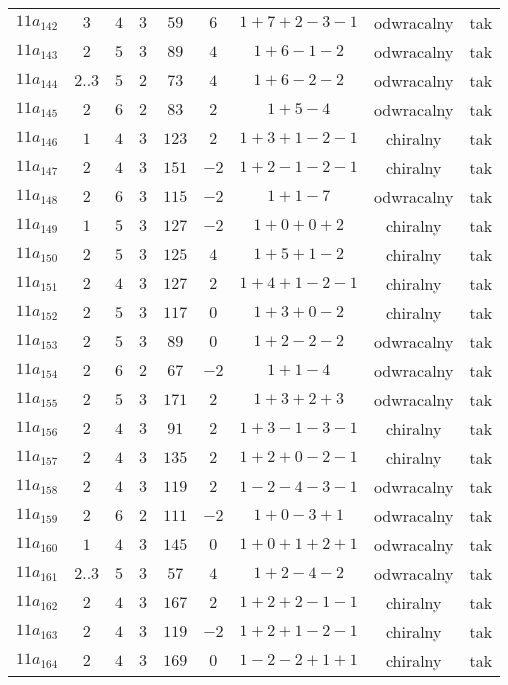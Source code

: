 \begin{longtable}{ccccccccc}
$11a_{142}$ & $3$ & $4$ & $3$ & $59$ & $6$ & $1+7+2-3-1$ & odwracalny & tak \\
$11a_{143}$ & $2$ & $5$ & $3$ & $89$ & $4$ & $1+6-1-2$ & odwracalny & tak \\
$11a_{144}$ & $2..3$ & $5$ & $2$ & $73$ & $4$ & $1+6-2-2$ & odwracalny & tak \\
$11a_{145}$ & $2$ & $6$ & $2$ & $83$ & $2$ & $1+5-4$ & odwracalny & tak \\
$11a_{146}$ & $1$ & $4$ & $3$ & $123$ & $2$ & $1+3+1-2-1$ & chiralny & tak \\
$11a_{147}$ & $2$ & $4$ & $3$ & $151$ & $-2$ & $1+2-1-2-1$ & chiralny & tak \\
$11a_{148}$ & $2$ & $6$ & $3$ & $115$ & $-2$ & $1+1-7$ & odwracalny & tak \\
$11a_{149}$ & $1$ & $5$ & $3$ & $127$ & $-2$ & $1+0+0+2$ & chiralny & tak \\
$11a_{150}$ & $2$ & $5$ & $3$ & $125$ & $4$ & $1+5+1-2$ & chiralny & tak \\
$11a_{151}$ & $2$ & $4$ & $3$ & $127$ & $2$ & $1+4+1-2-1$ & chiralny & tak \\
$11a_{152}$ & $2$ & $5$ & $3$ & $117$ & $0$ & $1+3+0-2$ & chiralny & tak \\
$11a_{153}$ & $2$ & $5$ & $3$ & $89$ & $0$ & $1+2-2-2$ & odwracalny & tak \\
$11a_{154}$ & $2$ & $6$ & $2$ & $67$ & $-2$ & $1+1-4$ & odwracalny & tak \\
$11a_{155}$ & $2$ & $5$ & $3$ & $171$ & $2$ & $1+3+2+3$ & odwracalny & tak \\
$11a_{156}$ & $2$ & $4$ & $3$ & $91$ & $2$ & $1+3-1-3-1$ & chiralny & tak \\
$11a_{157}$ & $2$ & $4$ & $3$ & $135$ & $2$ & $1+2+0-2-1$ & chiralny & tak \\
$11a_{158}$ & $2$ & $4$ & $3$ & $119$ & $2$ & $1-2-4-3-1$ & odwracalny & tak \\
$11a_{159}$ & $2$ & $6$ & $2$ & $111$ & $-2$ & $1+0-3+1$ & odwracalny & tak \\
$11a_{160}$ & $1$ & $4$ & $3$ & $145$ & $0$ & $1+0+1+2+1$ & odwracalny & tak \\
$11a_{161}$ & $2..3$ & $5$ & $3$ & $57$ & $4$ & $1+2-4-2$ & odwracalny & tak \\
$11a_{162}$ & $2$ & $4$ & $3$ & $167$ & $2$ & $1+2+2-1-1$ & chiralny & tak \\
$11a_{163}$ & $2$ & $4$ & $3$ & $119$ & $-2$ & $1+2+1-2-1$ & chiralny & tak \\
$11a_{164}$ & $2$ & $4$ & $3$ & $169$ & $0$ & $1-2-2+1+1$ & chiralny & tak \\

\end{longtable}
